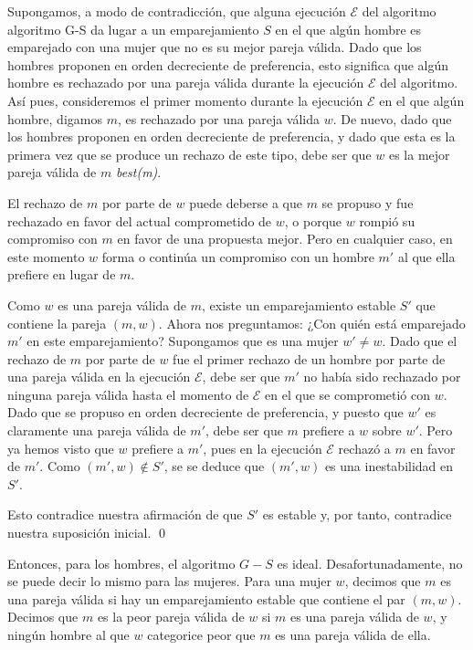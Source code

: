\documentclass[a4paper, 12pt]{book}
\theoremstyle{dotless}
\renewenvironment{proof}{{\noindent\bfseries Demostración.}}{\qed\vspace{12pt}}
\begin{document}
\begin{proof}
Supongamos, a modo de contradicción, que alguna ejecución $\mathcal{E}$ del algoritmo algoritmo G-S da lugar a un emparejamiento $S$ en el que algún hombre es emparejado con una mujer que no es su mejor pareja válida. Dado que los hombres proponen en orden decreciente de preferencia, esto significa que algún hombre es rechazado por una pareja válida durante la ejecución $\mathcal{E}$ del algoritmo. Así pues, consideremos el primer momento durante la ejecución $\mathcal{E}$ en el que algún hombre, digamos $m$, es rechazado por una pareja válida $w$. De nuevo, dado que los hombres proponen en orden decreciente de preferencia, y dado que esta es la primera vez que se produce un rechazo de este tipo, debe ser que $w$ es la mejor pareja válida de $m$ \textit{best(m)}. 

El rechazo de $m$ por parte de $w$ puede deberse a que $m$ se propuso y fue rechazado en favor del actual comprometido de $w$, o porque $w$ rompió su compromiso con $m$ en favor de una propuesta mejor. Pero en cualquier caso, en este momento $w$ forma o continúa un compromiso con un hombre $m'$ al que ella prefiere en lugar de $m$.

Como $w$ es una pareja válida de $m$, existe un emparejamiento estable $S'$ que contiene la pareja $(m, w)$. 
Ahora nos preguntamos: ¿Con quién está emparejado $m'$ en este emparejamiento? Supongamos que es una mujer $w' \neq w$. 
Dado que el rechazo de $m$ por parte de $w$ fue el primer rechazo de un hombre por parte de una pareja válida en la ejecución $\mathcal{E}$, debe ser que $m'$ no había sido rechazado por ninguna pareja válida hasta el momento de $\mathcal{E}$ en el que se comprometió con $w$. 
Dado que se propuso en orden decreciente de preferencia, y puesto que $w'$ es claramente una pareja válida de $m'$, debe ser que $m$ prefiere a $w$ sobre $w'$. 
Pero ya hemos visto que $w$ prefiere a $m'$, pues en la ejecución $\mathcal{E}$ rechazó a $m$ en favor de $m'$. Como $(m', w) \notin S'$, se se deduce que $(m', w)$ es una inestabilidad en $S'$. 

Esto contradice nuestra afirmación de que $S'$ es estable y, por tanto, contradice nuestra suposición inicial. 
\end{proof}

Entonces, para los hombres, el algoritmo $G-S$ es ideal. Desafortunadamente, no se puede decir lo mismo para las mujeres. Para una mujer $w$, decimos que $m$ es una pareja válida si hay un emparejamiento estable que contiene el par $(m, w)$. Decimos que $m$ es la peor pareja válida de $w$ si $m$ es una pareja válida de $w$, y ningún hombre al que $w$ categorice peor que $m$ es una pareja válida de ella.
\end{document}
